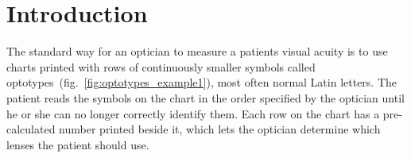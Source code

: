 \documentclass[12pt,a4paper,notitlepage]{report}
\begin{document}
\renewcommand\thechapter{\arabic{chapter}}
\setcounter{page}{1}
\chapter{ Introduction}
The standard way for an optician to measure a patients visual acuity is to use charts printed with rows of continuously smaller symbols called optotypes~(fig.~\ref{fig:optotypes_example1}), most often normal Latin letters. The patient reads the symbols on the chart in the order specified by the optician until he or she can no longer correctly identify them. Each row on the chart has a pre-calculated number printed beside it, which lets the optician determine which lenses the patient should use.
\end{document}

